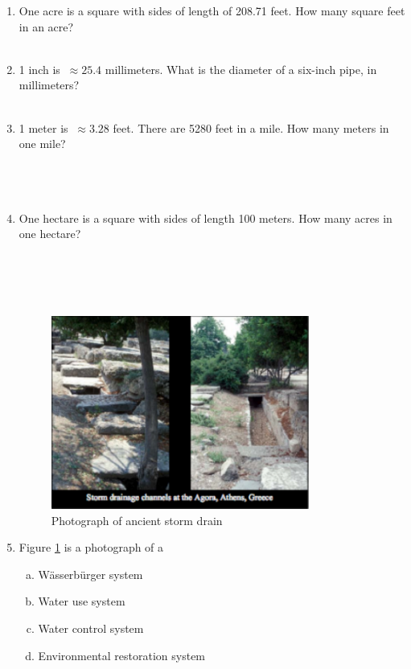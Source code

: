 \documentclass[11pt]{article}
\begin{document}


\begin{enumerate}
\item One acre is a square with sides of length of 208.71 feet.  How many square feet in an acre?
~\\
~\\
\item 1 inch is $~\approx 25.4$ millimeters.  What is the diameter of a six-inch pipe, in millimeters?
~\\
~\\
\item 1 meter is $~\approx 3.28$ feet.   There are 5280 feet in a mile.   How many meters in one mile?
~\\
~\\
~\\
~\\
\item One hectare is a square with sides of length 100 meters.  How many acres in one hectare?
~\\
~\\
~\\
~\\
~\\
\begin{figure}[h!] %
   \centering
   \includegraphics[height=2.5in]{greek-storm-drain.pdf} 
   \caption{Photograph of ancient storm drain}
   \label{fig:greek-storm-drain}
\end{figure}
\item Figure \ref{fig:greek-storm-drain} is a photograph of a
\begin{enumerate}[(a)]
\item W{\"a}sserb{\"u}rger system
\item Water use system
\item Water control system
\item Environmental restoration system
\end{enumerate}


\end{enumerate}
\end{document}
